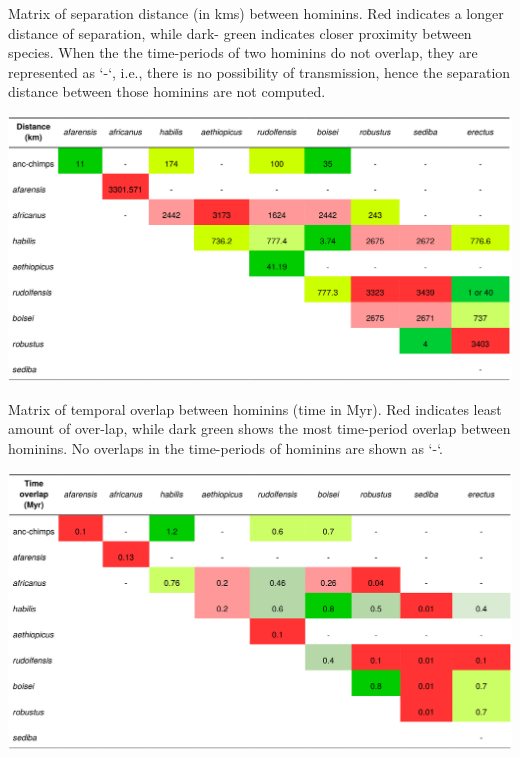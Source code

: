 \documentclass[fleqn,10pt]{wlscirep}
\begin{document}
\begin{landscape}
\begin{table}[!h]
	\caption{Matrix of separation distance (in kms) between hominins. Red indicates a longer distance of separation, while dark-
		green indicates closer proximity between species. When the the time-periods of two hominins do not overlap, they are represented as `-`, i.e., there is no possibility of transmission, hence the separation distance between those hominins are not computed.}
	\centering
	\label{table:distance}   
	\includegraphics[width=\textwidth]{figs/distance}
\end{table}  

\begin{table}[!h]
	\caption{Matrix of temporal overlap between hominins (time in Myr). Red indicates least amount of over-lap, while dark green
		shows the most time-period overlap between hominins. No overlaps in the time-periods of hominins are shown as `-`.}
	\centering
	\label{table:time}  
	\includegraphics[width=\textwidth]{figs/time}
 
\end{table}  
\end{landscape}
\end{document}
